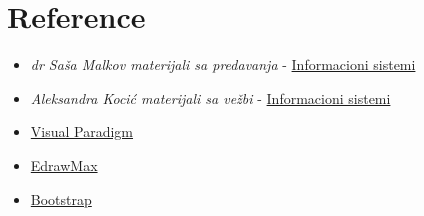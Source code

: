 \section{Reference}
\begin{itemize}
    \item \emph{dr Saša Malkov materijali sa predavanja } - \href{http://poincare.matf.bg.ac.rs/~smalkov/download.html?cap=Informacioni\%20sistemi&bp=is.r271.2018/public}{Informacioni sistemi}
    \item \emph{Aleksandra Kocić materijali sa vežbi } - \href{http://poincare.matf.bg.ac.rs/~asimic/is.html}{Informacioni sistemi}
    \item \href{https://www.visual-paradigm.com/}{Visual Paradigm}
    \item \href{https://www.edrawsoft.com/edraw-max.php}{EdrawMax}
    \item \href{https://getbootstrap.com/docs/4.2/getting-started/introduction}{Bootstrap}
\end{itemize}